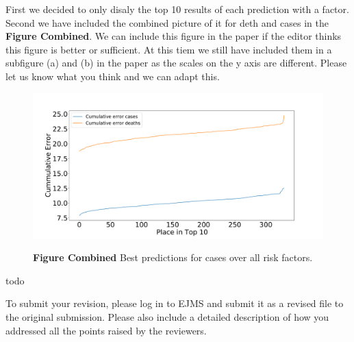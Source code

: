   {


First we decided to only disaly the top 10 results of each prediction
with a factor. Second we have included the combined picture of it for
deth and cases in the {\bf Figure Combined}. We can include this
figure in the paper if the editor thinks this figure is better or
sufficient. At this tiem we still have included them in a subfigure
(a) and (b) in the paper as the scales on the y axis are
different. Please let us know what you think and we can adapt this.

\begin{figure}[!h]
        \centering
        \includegraphics[width=1.0\textwidth]{images/predict/PlaceTop10_CasesAndDeath.pdf}
        
        {\bf Figure Combined} Best predictions for cases over all risk factors.
        

\end{figure}

}


  
  { todo}



To submit your revision, please log in to EJMS and submit it as a
revised file to the original submission. Please also include a
detailed description of how you addressed all the points raised by the
reviewers.

